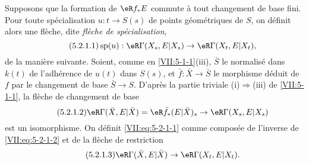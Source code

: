 Supposons que la formation de $\eR f_\ast E$ commute \`a tout changement de 
base fini. Pour toute sp\'ecialisation $u:t\to S(s)$ de points g\'eom\'etriques 
de $S$, on d\'efinit alors une fl\`eche, dite \emph{fl\`eche de 
sp\'ecialisation}, 
\begin{equation*}\tag{5.2.1.1}\label{VII:eq:5-2-1-1}
  \spe(u):\eR\Gamma(X_s,E|X_s) \to \eR\Gamma(X_t,E|X_t) \text{,}
\end{equation*}
de la mani\`ere suivante. Soient, comme en \ref{VII:5-1-1}(iii), $\bar S$ le 
normalis\'e dans $k(t)$ de l'adh\'erence de $u(t)$ dans $S(s)$, et 
$\bar f:\bar X\to \bar S$ le morphisme d\'eduit de $f$ par le changement de 
base $\bar S\to S$. D'apr\`es la partie triviale (i)$\Rightarrow$(iii) de 
\ref{VII:5-1-1}, la fl\`eche de changement de base
\begin{equation*}\tag{5.2.1.2}\label{VII:eq:5-2-1-2}
  \eR\Gamma(\bar X,E|\bar X)=\eR\bar f_\ast (E|\bar X)_s \to \eR\Gamma(X_s,E|X_s) 
\end{equation*}
est un isomorphisme. On d\'efinit \eqref{VII:eq:5-2-1-1} comme compos\'ee de 
l'inverse de \eqref{VII:eq:5-2-1-2} et de la fl\`eche de restriction 
\begin{equation*}\tag{5.2.1.3}\label{VII:eq:5-2-1-3}
  \eR\Gamma(\bar X,E|\bar X) \to \eR\Gamma(X_t,E|X_t) \text{.}
\end{equation*}





\subsubsection{}\label{VII:5-2-2}


